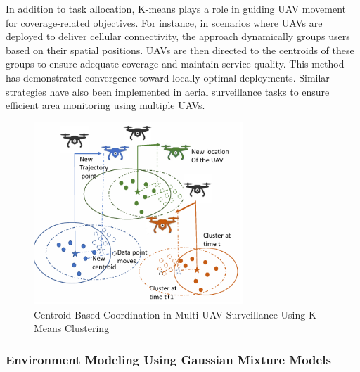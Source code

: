 In addition to task allocation, K-means plays a role in guiding UAV movement for coverage-related objectives. For instance, in scenarios where UAVs are deployed to deliver cellular connectivity, the approach dynamically groups users based on their spatial positions. UAVs are then directed to the centroids of these groups to ensure adequate coverage and maintain service quality. This method has demonstrated convergence toward locally optimal deployments. Similar strategies have also been implemented in aerial surveillance tasks to ensure efficient area monitoring using multiple UAVs.







    \begin{figure}[H]
        \centering
        \includegraphics[width=0.7\textwidth]{Figures/Chapter2/Section1/8.png}
        \caption{Centroid-Based Coordination in Multi-UAV Surveillance Using K-Means Clustering~\cite{huang2021navigating}}
        \label{centroid_kmeans_uav}
    \end{figure}








\subsubsection{Environment Modeling Using Gaussian Mixture Models}


